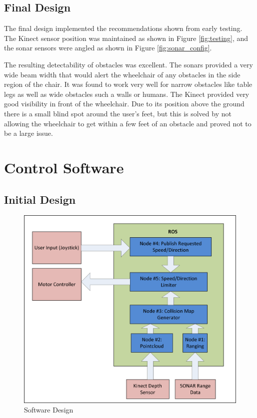 \documentclass[oneside,final,a4paper]{report}
\begin{document}
\section{Final Design}
The final design implemented the recommendations shown from early testing. The Kinect sensor position was maintained as shown in Figure \ref{fig:testing}, and the sonar sensors were angled as shown in Figure \ref{fig:sonar_config}.

The resulting detectability of obstacles was excellent. The sonars provided a very wide beam width that would alert the wheelchair of any obstacles in the side region of the chair. It was found to work very well for narrow obstacles like table legs as well as wide obstacles such a walls or humans. The Kinect provided very good visibility in front of the wheelchair. Due to its position above the ground there is a small blind spot around the user's feet, but this is solved by not allowing the wheelchair to get within a few feet of an obstacle and proved not to be a large issue.

\chapter{Control Software}

\section{Initial Design}
\begin{figure}[hbt]
 \centering
 \includegraphics[scale=0.9]{Software_Diagram}
 \caption{Software Design}\label{fig:software}
\end{figure}
\end{document}
